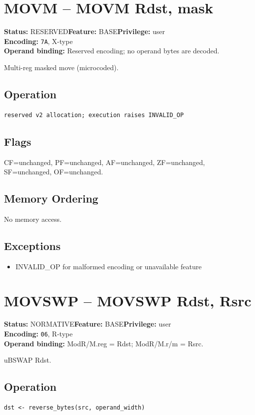 \documentclass[10pt]{article}
\begin{document}
\section{MOVM -- MOVM Rdst, mask}
\textbf{Status:} RESERVED\quad \textbf{Feature:} BASE\quad \textbf{Privilege:} user\\
\textbf{Encoding:} \texttt{7A}, X-type\\
\textbf{Operand binding:} Reserved encoding; no operand bytes are decoded.

Multi-reg masked move (microcoded).

\subsection*{Operation}
\begin{lstlisting}
reserved v2 allocation; execution raises INVALID_OP
\end{lstlisting}
\subsection*{Flags}
CF=unchanged, PF=unchanged, AF=unchanged, ZF=unchanged, SF=unchanged, OF=unchanged.
\subsection*{Memory Ordering}
No memory access.
\subsection*{Exceptions}
\begin{itemize}
\item INVALID\_OP for malformed encoding or unavailable feature
\end{itemize}
\clearpage

\section{MOVSWP -- MOVSWP Rdst, Rsrc}
\textbf{Status:} NORMATIVE\quad \textbf{Feature:} BASE\quad \textbf{Privilege:} user\\
\textbf{Encoding:} \texttt{06}, R-type\\
\textbf{Operand binding:} ModR/M.reg = Rdst; ModR/M.r/m = Rsrc.

uBSWAP Rdst.

\subsection*{Operation}
\begin{lstlisting}
dst <- reverse_bytes(src, operand_width)
\end{lstlisting}
\end{document}
